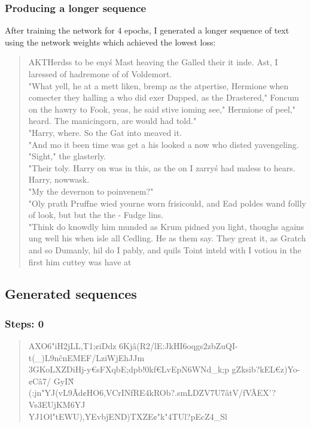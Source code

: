 \documentclass{article}
\begin{document}
\subsubsection*{Producing a longer sequence}
	After training the network for $4$ epochs, I generated a longer sequence of text using the network weights which achieved the lowest loss:
	\begin{quote}
		\smaller
		AKTHerdss to be eny\'s Mast heaving the Galled their it inde.  Ast, I laressed of hadremone of of Voldemort.\\
		"What yell, he at a mett liken, bremp as the atpertise, Hermione when comecter they halling a who did exer Dupped, as the Drastered," Foncum on the hawry to Fook, yeas, he said stive ioming see," Hermione of peel," heard.  The manicingorn, are would had told."\\
		"Harry, where.  So the Gat into meaved it.\\
		"And mo it been time was get a his looked a now who disted yavengeling.\\
		"Sight," the glasterly.\\
		"Their toly.  Harry on was in this, as the on I zarry\'s had maless to hears.  Harry, nowwask.\\
		"My the devernon to poinvenem?"\\
		"Oly prath Pruffne wied yourne worn frisicould, and Ead poldes wand follly of look, but but the the - Fudge lins.\\
		"Think do knowdly him munded as Krum pidned you light, thoughs agains ung well his when isle all Cedling.  He as them say.  They great it, as Gratch and so Dumanly, hil do I pably, and quils Toint inteld with I votiou in the first him cuttey was have at
	\end{quote}

\newpage
\subsection*{Generated sequences}

\subsubsection*{Steps: 0}
\begin{quote}
	\smaller
	AXO6"iH2jLL,T1;¢iDdz	6Kjâ(R2/lE:JkHI6oqgs2zbZuQI-t(\_)L9n\^cnEMEF/LziWjEhJJm\\3GKoLXZDiHj-y€sFXqbE;dpb!0kf€LvEpN6WNd\_k;p
	gZksib?kEL€z)Yo-¢Câ7/ GyI\^N\\(:jn"YJ(vL9Ãd¢HO6,VCrINfRE4kROb?.smLDZV7U7âtV/fVÃEX'?Vs3EUjKM6YJ\\YJ1Ol"tEWU),YEvb\^jEND)TXZE¢"k"4TUl?pEcZ4\_Sl
\end{quote}
\end{document}
